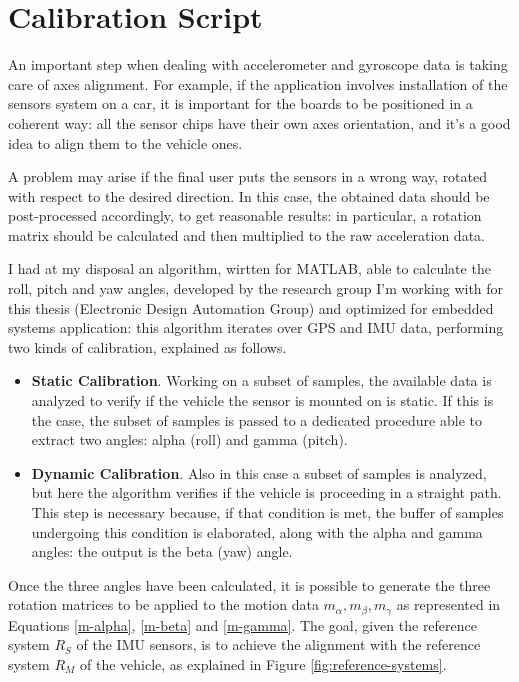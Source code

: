 \section{Calibration Script}

An important step when dealing with accelerometer and gyroscope data is taking care of axes alignment. For example, if the application involves installation of the sensors system on a car, it is important for the boards to be positioned in a coherent way: all the sensor chips have their own axes orientation, and it's a good idea to align them to the vehicle ones. 

A problem may arise if the final user puts the sensors in a wrong way, rotated with respect to the desired direction. In this case, the obtained data should be post-processed accordingly, to get reasonable results: in particular, a rotation matrix should be calculated and then multiplied to the raw acceleration data. 



I had at my disposal an algorithm, wirtten for MATLAB, able to calculate the roll, pitch and yaw angles, developed by the research group I'm working with for this thesis (Electronic Design Automation Group) and optimized for embedded systems application: this algorithm iterates over GPS and IMU data, performing two kinds of calibration, explained as follows.
\begin{itemize}
    \item \textbf{Static Calibration}. Working on a subset of samples, the available data is analyzed to verify if the vehicle the sensor is mounted on is static. If this is the case, the subset of samples is passed to a dedicated procedure able to extract two angles: alpha (roll) and gamma (pitch). 
    \item \textbf{Dynamic Calibration}. Also in this case a subset of samples is analyzed, but here the algorithm verifies if the vehicle is proceeding in a straight path. This step is necessary because, if that condition is met, the buffer of samples undergoing this condition is elaborated, along with the alpha and gamma angles: the output is the beta (yaw) angle. 
\end{itemize}

Once the three angles have been calculated, it is possible to generate the three rotation matrices to be applied to the motion data \(m_{\alpha} , m_{\beta} , m_{\gamma}\) as represented in Equations \ref{m-alpha}, \ref{m-beta} and \ref{m-gamma}. The goal, given the reference system \(R_S\) of the IMU sensors, is to achieve the alignment with the reference system \(R_M\) of the vehicle, as explained in Figure \ref{fig:reference-systems}.

